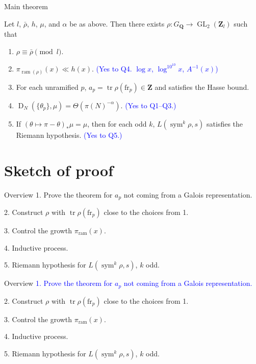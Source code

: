 \documentclass{beamer}
\DeclareMathOperator{\D}{D}
\DeclareMathOperator{\GL}{GL}
\DeclareMathOperator{\ram}{ram}
\DeclareMathOperator{\sym}{sym}
\DeclareMathOperator{\tr}{tr}
\newcommand{\bQ}{\mathbf{Q}}
\newcommand{\bZ}{\mathbf{Z}}
\newcommand{\frob}{\mathrm{fr}}
\begin{document}
\begin{frame}{Main theorem}
\begin{theorem}[M.]
Let $l$, $\bar\rho$, $h$, $\mu$, and $\alpha$ be as above. Then there exists 
$\rho\colon G_\bQ \to \GL_2(\bZ_l)$ such that 
\pause
\begin{enumerate}
\item
$\rho \equiv \bar\rho\pmod{l}$. 
\pause

\item
$\pi_{\ram(\rho)}(x) \ll h(x)$. 
\pause
\textcolor{blue}{(Yes to Q4. 
\pause
$\log x$, 
\pause
$\log^{10^{10}}x$, 
\pause
$A^{-1}(x)$)}
\pause

\item
For each unramified $p$, $a_p = \tr \rho(\frob_p)\in \bZ$ and satisfies the 
Hasse bound.
\pause

\item
$\D_N(\{\theta_p\},\mu) = \Theta(\pi(N)^{-\alpha})$. 
\pause
\textcolor{blue}{(Yes to Q1--Q3.)}
\pause

\item
If $(\theta\mapsto \pi-\theta)_\ast \mu = \mu$, then for each odd $k$, 
$L(\sym^k \rho,s)$ satisfies the Riemann hypothesis. 
\pause
\textcolor{blue}{(Yes to Q5.)}
\end{enumerate}
\end{theorem}
\end{frame}






\section{Sketch of proof}

\begin{frame}{Overview}
1. Prove the theorem for $a_p$ not coming from a Galois representation. 
\pause

2. Construct $\rho$ with $\tr\rho(\frob_p)$ close to the choices from 1. 
\pause

3. Control the growth $\pi_{\ram}(x)$. 
\pause

4. Inductive process.
\pause

5. Riemann hypothesis for $L(\sym^k\rho,s)$, $k$ odd.
\end{frame}



\begin{frame}{Overview}
\textcolor{blue}{
1. Prove the theorem for $a_p$ not coming from a Galois representation.}

\color{gray}
2. Construct $\rho$ with $\tr\rho(\frob_p)$ close to the choices from 1. 

3. Control the growth $\pi_{\ram}(x)$. 

4. Inductive process.

5. Riemann hypothesis for $L(\sym^k\rho,s)$, $k$ odd.
\end{frame}
\end{document}
